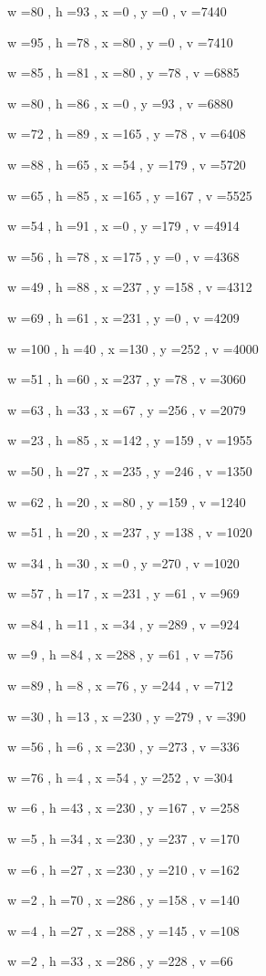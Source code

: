 \documentclass[11pt]{article}
\begin{document}
w =80 , h =93 , x =0 , y =0 , v =7440
\par
w =95 , h =78 , x =80 , y =0 , v =7410
\par
w =85 , h =81 , x =80 , y =78 , v =6885
\par
w =80 , h =86 , x =0 , y =93 , v =6880
\par
w =72 , h =89 , x =165 , y =78 , v =6408
\par
w =88 , h =65 , x =54 , y =179 , v =5720
\par
w =65 , h =85 , x =165 , y =167 , v =5525
\par
w =54 , h =91 , x =0 , y =179 , v =4914
\par
w =56 , h =78 , x =175 , y =0 , v =4368
\par
w =49 , h =88 , x =237 , y =158 , v =4312
\par
w =69 , h =61 , x =231 , y =0 , v =4209
\par
w =100 , h =40 , x =130 , y =252 , v =4000
\par
w =51 , h =60 , x =237 , y =78 , v =3060
\par
w =63 , h =33 , x =67 , y =256 , v =2079
\par
w =23 , h =85 , x =142 , y =159 , v =1955
\par
w =50 , h =27 , x =235 , y =246 , v =1350
\par
w =62 , h =20 , x =80 , y =159 , v =1240
\par
w =51 , h =20 , x =237 , y =138 , v =1020
\par
w =34 , h =30 , x =0 , y =270 , v =1020
\par
w =57 , h =17 , x =231 , y =61 , v =969
\par
w =84 , h =11 , x =34 , y =289 , v =924
\par
w =9 , h =84 , x =288 , y =61 , v =756
\par
w =89 , h =8 , x =76 , y =244 , v =712
\par
w =30 , h =13 , x =230 , y =279 , v =390
\par
w =56 , h =6 , x =230 , y =273 , v =336
\par
w =76 , h =4 , x =54 , y =252 , v =304
\par
w =6 , h =43 , x =230 , y =167 , v =258
\par
w =5 , h =34 , x =230 , y =237 , v =170
\par
w =6 , h =27 , x =230 , y =210 , v =162
\par
w =2 , h =70 , x =286 , y =158 , v =140
\par
w =4 , h =27 , x =288 , y =145 , v =108
\par
w =2 , h =33 , x =286 , y =228 , v =66
\par
\newpage
\end{document}
